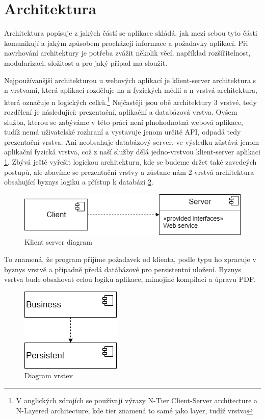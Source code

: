 \section{Architektura}
Architektura\cite{arch} popisuje z jakých částí se aplikace skládá, jak mezi sebou tyto části komunikují a jakým způsobem procházejí informace a požadavky aplikací. Při navrhování architektury je potřeba zvážit několik věcí, například rozšířitelnost, modularizaci, složitost a pro jaký případ ma sloužit. 
\par
Nejpoužívanšjší architekturou u webových aplikací je klient-server architektura s n vrstvami, která aplikaci rozděluje na n fyzických médií a n vrstvá architektura, která označuje n logických celků.\footnote{V anglických zdrojích se používají výrazy N-Tier Client-Server architecture a N-Layered architecture, kde tier znamená to samé jako layer, tudíž vrstva} Nejčastěji jsou obě architektury 3 vrstvé, tedy rozdělení je následující: prezentační, aplikační a databázová vrstva. Ovšem služba, kterou se zabýváme v této práci není plnohodnotná webová aplikace, tudíž nemá uživatelské rozhraní a vystavuje jenom určité API, odpadá tedy prezentační vrstva. Ani neobsahuje databázový server, ve výsledku zůstává jenom aplikační fyzická vrstva, což z naší služby dělá jedno-vrstvou klient-server aplikaci \ref{fig:client}. Zbývá ještě vyřešit logickou architekturu, kde se budeme držet také zavedeých postupů, ale zbavíme se prezentační vrstvy a zůstane nám 2-vrstvá architektura obsahující byznys logiku a přístup k databázi \ref{fig:layers}.  

\begin{figure}[H]
	\includegraphics[scale=0.7]{clientServer}
	\centering
	\caption{Klient server diagram}
	\label{fig:client}
\end{figure}

To znamená, že program přijíme požadavek od klienta, podle typu ho zpracuje v byznys vrstvě a případně předá datábázové pro persistentní uložení. Byznys vsrtva bude obsahovat celou logiku aplikace, mimojiné kompilaci a úpravu PDF.

\begin{figure}[H]
	\includegraphics[scale=0.7]{layers}
	\centering
	\caption{Diagram vrstev}
	\label{fig:layers}
\end{figure}

